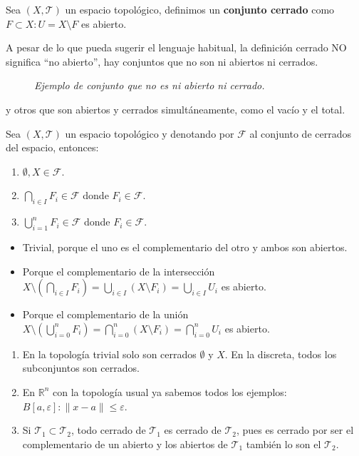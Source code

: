 \begin{defi}
Sea $\left( X, \mathcal{T} \right)$ un espacio topológico, definimos un \textbf{conjunto cerrado} como $F \subset X : U = X \setminus F$ es abierto.
\end{defi}
\begin{obs}
A pesar de lo que pueda sugerir el lenguaje habitual, la definición cerrado NO significa ``no abierto'', hay conjuntos que no son ni abiertos ni cerrados.
\begin{figure}[H]
    \centering
    \caption{\textit{Ejemplo de conjunto que no es ni abierto ni cerrado.}}
    \label{fig:observación-abiertos-y-cerrados.}
\end{figure}
y otros que son abiertos y cerrados simultáneamente, como el vacío y el total.
\end{obs}

\begin{prop}
Sea $(X,\mathcal{T})$ un espacio topológico y denotando por $\mathcal{F}$ al conjunto de cerrados del espacio, entonces:
\begin{enumerate}
    \item $\emptyset, X \in \mathcal{F}$.
    \item $\bigcap_{i \in I} F_i \in \mathcal{F}$ donde $F_i \in \mathcal{F}$.
    \item $\bigcup_{i=1}^n F_i \in \mathcal{F}$ donde $F_i \in \mathcal{F}$.
\end{enumerate}
\end{prop}
\begin{demo}
\begin{itemize}
\item Trivial, porque el uno es el complementario del otro y ambos son abiertos.

\item Porque el complementario de la intersección $X\setminus \left(\bigcap_{i \in I} F_i \right) = \bigcup_{i \in I} \left( X \setminus F_i \right) = \bigcup_{i \in I} U_i$ es abierto.

\item Porque el complementario de la unión $X\setminus \left(\bigcup_{i = 0}^n F_i\right) = \bigcap_{i=0}^n \left( X \setminus F_i\right) = \bigcap_{i=0}^n U_i$ es abierto.
\end{itemize}
\end{demo}

\begin{ej}
\begin{enumerate}
    \item En la topología trivial solo son cerrados $\emptyset$ y $X$. En la discreta, todos los subconjuntos son cerrados.
    \item En $\mathbb{R}^n$ con la topología usual ya sabemos todos los ejemplos: $B\left[ a, \varepsilon \right] : \lVert x - a \rVert \le \varepsilon$.
    \item Si $\mathcal{T}_1 \subset \mathcal{T}_2$, todo cerrado de $\mathcal{T}_1$ es cerrado de $\mathcal{T}_2$, pues es cerrado por ser el complementario de un abierto y los abiertos de $\mathcal{T}_1$ también lo son el $\mathcal{T}_2$.
\end{enumerate}
\end{ej}

